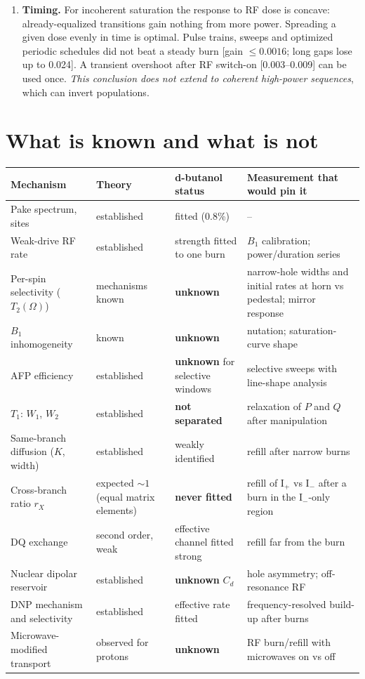 \documentclass[11pt]{article}
\begin{document}
\begin{enumerate}
\item \textbf{Timing.} For incoherent saturation the response to RF dose is concave:
already-equalized transitions gain nothing from more power. Spreading a given dose evenly in
time is optimal. Pulse trains, sweeps and optimized periodic schedules did not beat a steady
burn [gain $\le0.0016$; long gaps lose up to 0.024]. A transient overshoot after RF switch-on
[0.003--0.009] can be used once. \emph{This conclusion does not extend to coherent high-power
sequences}, which can invert populations.
\end{enumerate}

\section{What is known and what is not}
\label{sec:open}

\begin{longtable}{@{}p{3.6cm}p{3.6cm}p{3.1cm}p{4.6cm}@{}}
\toprule
Mechanism & Theory & d-butanol status & Measurement that would pin it\\
\midrule
\endhead
Pake spectrum, sites & established \cite{Wasylishen2012,Pake1948} & fitted (0.8\%) & --\\
Weak-drive RF rate & established \cite{Abragam1961} & strength fitted to one burn & $B_1$ calibration; power/duration series\\
Per-spin selectivity ($T_2(\Omega)$) & mechanisms known \cite{VanVleck1948} & \textbf{unknown} & narrow-hole widths and initial rates at horn vs pedestal; mirror response\\
$B_1$ inhomogeneity & known & \textbf{unknown} & nutation; saturation-curve shape\\
AFP efficiency & established \cite{GarwoodDelaBarre2001} & \textbf{unknown} for selective windows & selective sweeps with line-shape analysis\\
$T_1$: $W_1$, $W_2$ & established \cite{Abragam1961} & \textbf{not separated} & relaxation of $P$ and $Q$ after manipulation\\
Same-branch diffusion ($K$, width) & established \cite{SuterErnst1985} & weakly identified & refill after narrow burns\\
Cross-branch ratio $r_X$ & expected $\sim1$ (equal matrix elements) & \textbf{never fitted} & refill of I$_+$ vs I$_-$ after a burn in the I$_-$-only region\\
DQ exchange & second order, weak & effective channel fitted strong & refill far from the burn\\
Nuclear dipolar reservoir & established \cite{Provotorov1962,Goldman1970} & \textbf{unknown} $C_d$ & hole asymmetry; off-resonance RF\\
DNP mechanism and selectivity & established \cite{AbragamGoldman1978,Wenckebach2016} & effective rate fitted & frequency-resolved build-up after burns\\
Microwave-modified transport & observed for protons \cite{Chessari2023} & \textbf{unknown} & RF burn/refill with microwaves on vs off\\
\bottomrule
\end{longtable}
\end{document}
